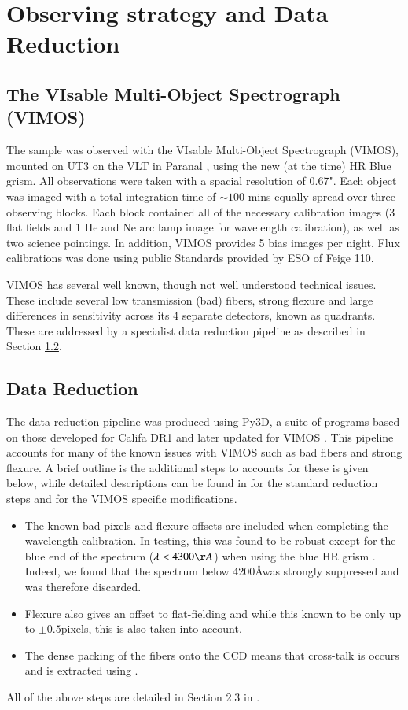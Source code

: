 \documentclass[a4paper,fleqn,usenatbib,useAMS]{mnras}
\begin{document}
\section{Observing strategy and Data Reduction}
	\label{sec:obs}
	\subsection{The VIsable Multi-Object Spectrograph (VIMOS)}
		\label{subsec:VIMOS}
		The sample was observed with the VIsable Multi-Object Spectrograph (VIMOS), mounted on UT3 on the VLT in Paranal \citep{LeFevre2003}, using the new (at the time) HR Blue grism. All observations were taken with a spacial resolution of 0.67". Each object was imaged with a total integration time of $\sim 100$ mins equally spread over three observing blocks. Each block contained all of the necessary calibration images (3 flat fields and 1 He and Ne arc lamp image for wavelength calibration), as well as two science pointings. In addition, VIMOS provides 5 bias images per night. Flux calibrations was done using public Standards provided by ESO of Feige 110.

		VIMOS has several well known, though not well understood technical issues. These include several low transmission (bad) fibers, strong flexure and large differences in sensitivity across its 4 separate detectors, known as quadrants. These are addressed by a specialist data reduction pipeline as described in Section \ref{subsec:reduct}. 

	\subsection{Data Reduction}
		\label{subsec:reduct}
		The data reduction pipeline was produced using Py3D, a suite of programs based on those developed for Califa DR1 \citep{Sanchez2011, Husemann2013} and later updated for VIMOS \citep{Husemann2014}. This pipeline accounts for many of the known issues with VIMOS such as bad fibers and strong flexure. A brief outline is the additional steps to accounts for these is given below, while detailed descriptions can be found in \citet{Sanchez2011} for the standard reduction steps and \citep{Husemann2014} for the VIMOS specific modifications. 
		\begin{itemize}
		\item The known bad pixels and flexure offsets are included when completing the wavelength calibration. In testing, this was found to be robust except for the blue end of the spectrum ($\lambda < 4300 \AA$) when using the blue HR grism \citep{Husemann2014}. Indeed, we found that the spectrum below 4200\AA was strongly suppressed and was therefore discarded.
		\item Flexure also gives an offset to flat-fielding and while this known to be only up to $\pm0.5$pixels, this is also taken into account.
		\item The dense packing of the fibers onto the CCD means that cross-talk is occurs and is extracted using \citep{Horne1986}. 
		\end{itemize}
		All of the above steps are detailed in Section 2.3 in \citet{Husemann2014}.
\end{document}
